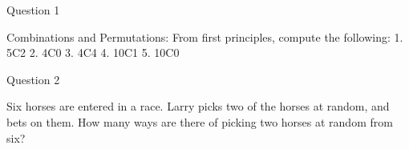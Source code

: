 \documentclass[IntroMain.tex]{subfiles}
\begin{document}
\begin{frame}
	
	Question 1 
	
	Combinations and Permutations: From first principles, compute the following:
	1.	5C2
	2.	4C0
	3.	4C4
	4.	10C1
	5.	10C0
	
\end{frame}
\begin{frame}
	
	Question 2
	
	Six horses are entered in a race. Larry picks two of the horses at random, and bets on them. 
	How many ways are there of picking two horses at random from six?
	
\end{frame}
\end{document}
